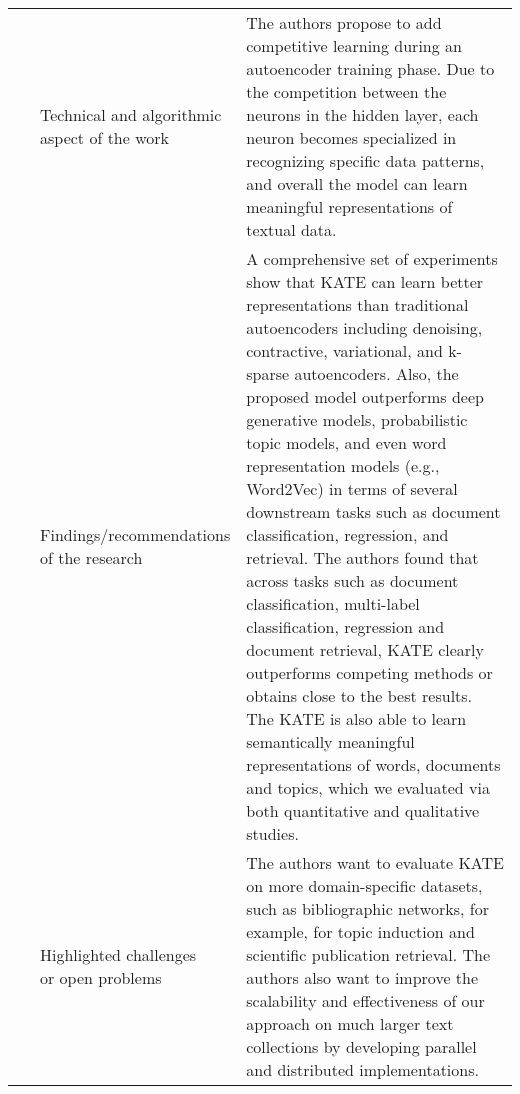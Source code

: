 \begin{landscape}
\begin{longtable}{lp{}p{}}
	\multirow{3}[0]{*}{~\citep{Chen2017}} & 
    \specialcell{Technical and algorithmic \\ aspect of the work} &
    The authors propose to add competitive learning during an autoencoder training phase. Due to the competition between the neurons in the hidden layer, each neuron becomes specialized in recognizing specific data patterns, and overall the model can learn meaningful representations of textual data.    
    \\ & 
    \specialcell{Findings/recommendations \\ of the research} & 
    A comprehensive set of experiments show that KATE can learn better representations than traditional autoencoders including denoising, contractive, variational, and k-sparse autoencoders. Also, the proposed model outperforms deep generative models, probabilistic topic models, and even word representation models (e.g., Word2Vec) in terms of several downstream tasks such as document classification, regression, and retrieval. The authors found that across tasks such as document classification, multi-label classification, regression and document retrieval, KATE clearly outperforms competing methods or obtains close to the best results. The KATE is also able to learn semantically meaningful representations of words, documents and topics, which we evaluated via both quantitative and qualitative studies. 
    \\ & 
    \specialcell{Highlighted challenges \\ or open problems} & 
    The authors want to evaluate KATE on more domain-specific datasets, such as bibliographic networks, for example, for topic induction and scientific publication retrieval. The authors also want to improve the scalability and effectiveness of our approach on much larger text collections by developing parallel and distributed implementations.
    \\
		

\end{longtable}
\end{landscape}
